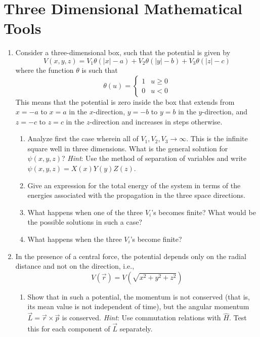 \documentclass[../psets.tex]{subfiles}
\begin{document}
\section{Three Dimensional Mathematical Tools}
\begin{enumerate}
    \item {}Consider a three-dimensional box, such that the potential is given by
    \begin{equation}
        V(x,y,z) = V_1\theta(|x|-a)+V_2\theta(|y|-b)+V_3\theta(|z|-c)
    \end{equation}
    where the function $\theta$ is such that
    \begin{equation}
        \theta(u) =
        \begin{cases}
            1 & u\geq 0\\
            0 & u<0
        \end{cases}
    \end{equation}
    This means that the potential is zero inside the box that extends from $x=-a$ to $x=a$ in the $x$-direction, $y=-b$ to $y=b$ in the $y$-direction, and $z=-c$ to $z=c$ in the $z$-direction and increases in steps otherwise.
    \begin{enumerate}
        \item Analyze first the case wherein all of $V_1,V_2,V_3\to\infty$. This is the infinite square well in three dimensions. What is the general solution for $\psi(x,y,z)$? \emph{Hint}: Use the method of separation of variables and write $\psi(x,y,z)=X(x)Y(y)Z(z)$.
        \item Give an expression for the total energy of the system in terms of the energies associated with the propagation in the three space directions.
        \item What happens when one of the three $V_i$'s becomes finite? What would be the possible solutions in such a case?
        \item What happens when the three $V_i$'s become finite?
    \end{enumerate}
    \item In the presence of a central force, the potential depends only on the radial distance and not on the direction, i.e.,
    \begin{equation}
        V(\vec{r}) = V(\sqrt{x^2+y^2+z^2})
    \end{equation}
    \begin{enumerate}
        \item Show that in such a potential, the momentum is not conserved (that is, its mean value is not independent of time), but the angular momentum $\vec{L}=\vec{r}\times\vec{p}$ is conserved. \emph{Hint}: Use commutation relations with $\hat{H}$. Test this for each component of $\vec{L}$ separately.

\end{enumerate}
\end{enumerate}
\end{document}
